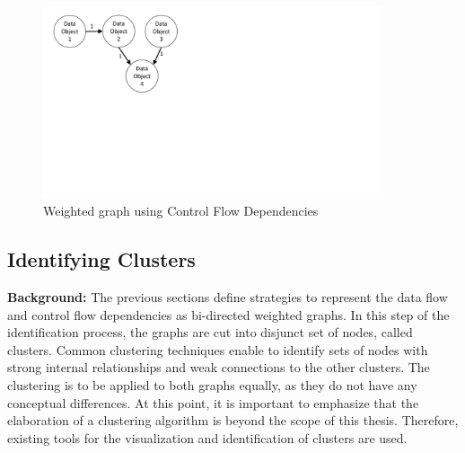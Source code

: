 \begin{figure}[h!]
	\centering
	\includegraphics[width=10cm, trim={1.5cm 9.5cm 16.0cm 0cm}]{img/DataFlowGraph.pdf}
	\caption{Weighted graph using Control Flow Dependencies}
	\label{fig:dataFlowGraph}
\end{figure}








\subsection{Identifying Clusters}
\label{sec:Solution:IdentifyCluster}
\textbf{Background:} The previous sections define strategies to represent the data flow and control flow dependencies as bi-directed weighted graphs. In this step of the identification process, the graphs are cut into disjunct set of nodes, called clusters. Common clustering techniques enable to identify sets of nodes with strong internal relationships and weak connections to the other clusters. The clustering is to be applied to both graphs equally, as they do not have any conceptual differences. At this point, it is important to emphasize that the elaboration of a clustering algorithm is beyond the scope of this thesis. Therefore, existing tools for the visualization and identification of clusters are used. \\

